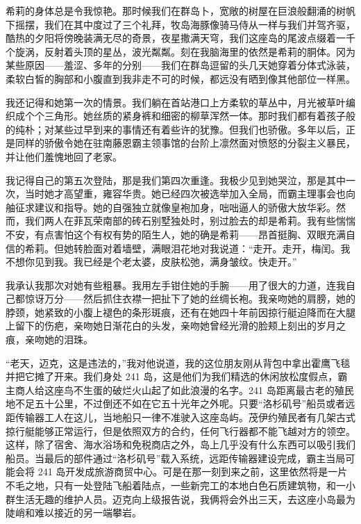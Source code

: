 \documentclass[AutoFakeBold=true]{book}
\begin{document}
希莉的身体总是令我惊艳。那时候我们在群岛卜，宽敞的树屋在巨浪般翻涌的树帆下摇摆，我们在其中度过了三个礼拜，牧岛海豚像骑马侍从一样与我们并驾齐驱，酷热的夕阳将傍晚装满无尽的奇景，夜星撒满天穹，我们这座岛的尾波点缀着一千个旋涡，反射着头顶的星丛，波光粼粼。刻在我脑海里的依然是希莉的胴体。冈为某些原因——羞涩、多年的分别——我们在群岛逗留的头几天她穿着分体式泳装，柔软白皙的胸部和小腹直到我非走不可的时候，都远没有晒到像其他部位一样黑。

我还记得和她第一次的情景。我们躺在首站港口上方柔软的草丛中，月光被草叶编织成个个三角形。她丝质的紧身裤和细密的柳草浑然一体。那时我们都有着孩子般的纯朴；对某些过早到来的事情还有着些许的犹豫。但我们也骄傲。多年以后，正是同样的骄傲令她在驻南藤恩霸主领事馆的台阶上凛然面对愤怒的分裂主义暴民，并让他们羞愧地回了老家。

我记得自己的第五次登陆，那是我们第四次重逢。我极少见到她哭泣，那是其中一次，当时她才高望重，雍容华贵。她已经四次被选举加入全局，而霸主理事会也向舳征求建议和指导。她的自强独立就像皇袍加身，咄咄逼人的骄傲大放华彩。然而，我们两人在菲瓦荣南部的砖石别墅独处时，别过脸去的却是希莉。我有些惴惴不安，有点害怕这个有权有势的陌生人，她的确是希莉——昂首挺胸、双眼充满自信的希莉。但她转脸面对着墙壁，满眼泪花地对我说道：``走开。走开，梅闰。我不想你见到我。我已经是个老太婆，皮肤松弛，满身皱纹。快走开。''

我承认我那次对她有些粗暴。我用左手钳住她的手腕——用了很大的力道，连我自己都惊讶万分——然后抓住衣襟一把扯下了她的丝绸长袍。我亲吻她的肩膀，她的脖颈，她紧致的小腹上褪色的条形斑痕，还有在她四十年前因掠行艇迫降而在大腿上留下的伤疤，亲吻她日渐花白的头发，亲吻她曾经光滑的脸颊上刻出的岁月之痕，亲吻她的泪珠。

\vspace*{1em}

``老天，迈克，这是违法的，''我对他说道，我的这位朋友刚从背包中拿出霍鹰飞毯并把它摊了开来。我们身处 241 岛，这是他们为我们精选的休闲放松度假点，霸主商人给这座鸟不生蛋的破烂火山起了如此浪漫的名字。241 岛距离最古老的殖民地不足五十公里，不过倒还不如在它五十光年之外呢。只要``洛杉矶号''船员或者远距传输器工人在这儿，当地船只一律不准驶入这座岛屿。茂伊约殖民者有几架古式掠行艇能够正常运行，但是依照双方的合约，任何飞行器都不能飞越对方的领空。这样，除了宿舍、海水浴场和免税商店之外，岛上几乎没有什么东西可以吸引我们船员。当最后的部件通过``洛杉矶号''载入系统，远距传输器建设完成，霸主当局可能会将 241 岛开发成旅游商贸中心。可是在那一刻到来之前，这里依然将是一片不毛之地，只有一处登陆飞船着陆点，一些新完工的本地白色石质建筑物，和一小群生活无趣的维护人员。迈克向上级报告说，我俩将会外出三天，去这座小岛最为陡峭和难以接近的另一端攀岩。
\end{document}
